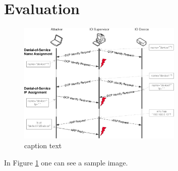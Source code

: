 \section{Evaluation}
\label{sec:results}

\lipsum

\begin{figure}[h]
	\centering
	\includegraphics[width=0.7\textwidth]{figures/sample.pdf}
	\caption{caption text}
	\label{fig:sample}
\end{figure}

In Figure \ref{fig:sample} one can see a sample image.

\lipsum
